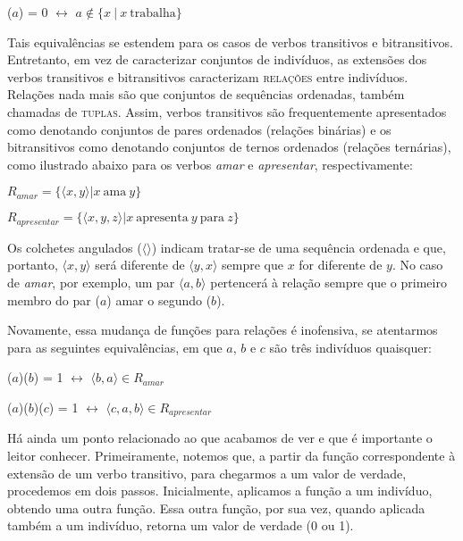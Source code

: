 \begin{exe}
	\ex {}($a$) = 0 $\leftrightarrow$ $a \notin \{x\ | \ x\ \text{trabalha} \}$
\end{exe}

\n Tais equivalências se
estendem para os casos de verbos transitivos e bitransitivos. Entretanto, em vez de caracterizar conjuntos de indivíduos, as extensões dos verbos transitivos e bitransitivos caracterizam \textsc{relações} entre indivíduos. Relações nada mais são que conjuntos de sequências ordenadas, também chamadas de \textsc{tuplas}. Assim, verbos transitivos são frequentemente apresentados como denotando conjuntos de pares ordenados (relações binárias) e os bitransitivos como denotando conjuntos de ternos ordenados (relações ternárias), como ilustrado abaixo para os verbos \textit{amar} e \textit{apresentar}, respectivamente:

\begin{exe}
	\ex $R_{amar} = \{\langle x,y \rangle | x\ \text{ama}\ y\}$
\end{exe}

\begin{exe}
	\ex $R_{apresentar} = \{\langle x,y,z \rangle | x\ \text{apresenta}\ y\ \text{para}\ z\}$
\end{exe}

\n Os colchetes angulados ($\langle \rangle$) indicam tratar-se de uma sequência ordenada e que, portanto, $\langle x,y \rangle$ será diferente de $\langle y,x \rangle$ sempre que $x$ for diferente de $y$. No caso de \textit{amar}, por exemplo, um par $\langle a,b \rangle$ pertencerá à relação sempre que o primeiro membro do par ($a$) amar o segundo ($b$).

Novamente, essa mudança de funções para relações é inofensiva, se atentarmos para as seguintes equivalências, em que $a$, $b$ e $c$ são três indivíduos quaisquer:

\begin{exe}
	\ex {}($a$)($b$) = 1 $\leftrightarrow$ $\langle b,a \rangle \in R_{amar}$
\end{exe}

\begin{exe}
	\ex {}($a$)($b$)($c$) = 1 $\leftrightarrow$ $\langle c,a,b \rangle \in R_{apresentar}$
\end{exe}

Há ainda um ponto relacionado ao que acabamos de ver e que é importante o leitor conhecer. Primeiramente, notemos que, a partir da função correspondente à extensão de um verbo transitivo, para chegarmos a um valor de verdade, procedemos em dois passos. Inicialmente, aplicamos a função a um indivíduo, obtendo uma outra função. Essa outra função, por sua vez, quando aplicada também a um indivíduo, retorna um valor de verdade (0 ou 1). 

